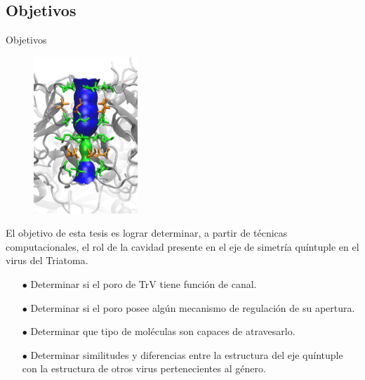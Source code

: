 \documentclass[8pt]{beamer}
\begin{document}
\begin{frame}[t]

\end{frame}

%
%

\subsection*{Objetivos}
\begin{frame}[t]{Objetivos}
\justifying
\begin{figure}
\vspace{-0.5cm}
\Centering
\includegraphics[width=0.35\textwidth]{Figure/TrV_Sideview_Pore_2.png}
\end{figure}

El objetivo de esta tesis es lograr \alert{determinar}, a partir de técnicas computacionales, el \alert{rol de la cavidad presente en el eje de simetría quíntuple} en el virus del Triatoma.
\begin{itemize}
\justifying
\item[$\bullet$] Determinar si el poro de TrV tiene función de canal.
\item[$\bullet$] Determinar si el poro posee algún mecanismo de regulación de su apertura.
\item[$\bullet$] Determinar que tipo de moléculas son capaces de atravesarlo.
\item[$\bullet$] Determinar similitudes y diferencias entre la estructura del eje quíntuple con la estructura de otros virus pertenecientes al género.
\end{itemize}

\end{frame}
\end{document}
